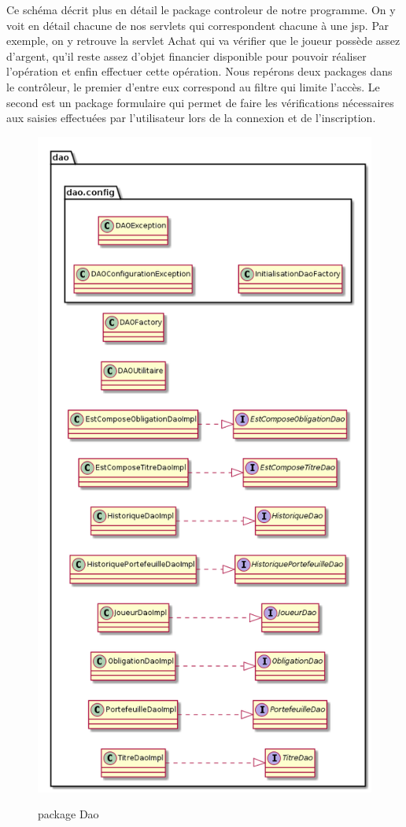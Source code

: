 Ce schéma décrit plus en détail le package controleur de notre programme. On y voit en détail chacune de nos servlets qui correspondent chacune à une jsp. Par exemple, on y retrouve la servlet Achat qui va vérifier que le joueur possède assez d'argent, qu'il reste assez d'objet financier disponible pour pouvoir réaliser l'opération et enfin effectuer cette opération. Nous repérons deux packages dans le contrôleur, le premier d'entre eux correspond au filtre qui limite l'accès. Le second est un package formulaire qui permet de faire les vérifications nécessaires aux saisies effectuées par l'utilisateur lors de la connexion et de l'inscription. 
\begin{figure}[H]
  \center
  \includegraphics[scale=0.25]{../graph/packageDAO.png} \\
  \caption{package Dao}
\end{figure}

